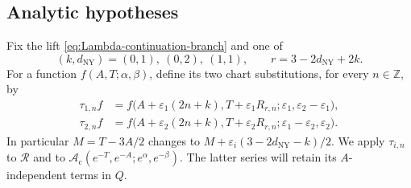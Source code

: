 \documentclass{amsart}
\theoremstyle{definition}
\numberwithin{equation}{section}
\newcommand{\Z}{\mathbb Z}
\newcommand{\eps}{\varepsilon}
\begin{document}
\subsection{Analytic hypotheses}
Fix the lift \eqref{eq:Lambda-continuation-branch} and one of
\[
 (k,d_{\mathrm{NY}})=(0,1),\ (0,2),\ (1,1),
 \qquad r=3-2d_{\mathrm{NY}}+2k.
\]
For a function \(f(A,T;\alpha,\beta)\), define its two chart substitutions, for every \(n\in\Z\), by
\begin{equation}
\begin{aligned}
 \tau_{1,n}f&=
 f\bigl(A+\eps_1(2n+k),T+\eps_1R_{r,n};
        \eps_1,\eps_2-\eps_1\bigr),\\
 \tau_{2,n}f&=
 f\bigl(A+\eps_2(2n+k),T+\eps_2R_{r,n};
        \eps_1-\eps_2,\eps_2\bigr).
\end{aligned}
\label{eq:analytic-chart-operators}
\end{equation}
In particular \(M=T-3A/2\) changes to
\(M+\eps_i(3-2d_{\mathrm{NY}}-k)/2\).
We apply \(\tau_{i,n}\) to \(\mathcal R\) and to
\(\mathscr A_{\mathrm c}(e^{-T},e^{-A};e^\alpha,e^{-\beta})\).
The latter series will retain its \(A\)-independent terms in \(Q\).
\end{document}
